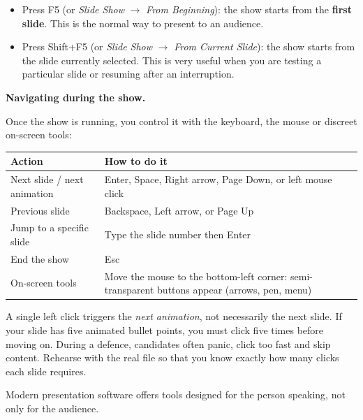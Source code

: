 \documentclass[11pt]{article}
\newcommand{\cle}[1]{{\popxbold\color{popdark}#1}}
\newcounter{popsec}
\newcounter{popsub}
\newcommand{\courssub}[1]{%
  \stepcounter{popsub}%
  \par\vspace{9pt}\noindent{\popxbold\fontsize{11.5}{13}\selectfont\color{popink}{\color{poporange}\thepopsec.\thepopsub}\hspace{6pt}#1}\par\nopagebreak\vspace{4pt}
}
\begin{document}
\begin{itemize}
\item Press \cle{F5} (or \emph{Slide Show} $\rightarrow$ \emph{From Beginning}): the show starts from the \textbf{first slide}. This is the normal way to present to an audience.
\item Press \cle{Shift+F5} (or \emph{Slide Show} $\rightarrow$ \emph{From Current Slide}): the show starts from the slide currently selected. This is very useful when you are testing a particular slide or resuming after an interruption.
\end{itemize}

\textbf{Navigating during the show.}\par
Once the show is running, you control it with the keyboard, the mouse or discreet on-screen tools:

\begin{center}
\begin{tabularx}{\linewidth}{|l|X|}
\hline
\rowcolor{popblueL} \textbf{Action} & \textbf{How to do it} \\
\hline
Next slide / next animation & Enter, Space, Right arrow, Page Down, or left mouse click \\
\hline
Previous slide & Backspace, Left arrow, or Page Up \\
\hline
Jump to a specific slide & Type the slide number then Enter \\
\hline
End the show & \cle{Esc} \\
\hline
On-screen tools & Move the mouse to the bottom-left corner: semi-transparent buttons appear (arrows, pen, menu) \\
\hline
\end{tabularx}
\end{center}

\begin{attention}
A single left click triggers the \emph{next animation}, not necessarily the next slide. If your slide has five animated bullet points, you must click five times before moving on. During a defence, candidates often panic, click too fast and skip content. Rehearse with the real file so that you know exactly how many clicks each slide requires.
\end{attention}

\courssub{Presenter Tools}

Modern presentation software offers tools designed for the person speaking, not only for the audience.
\end{document}
